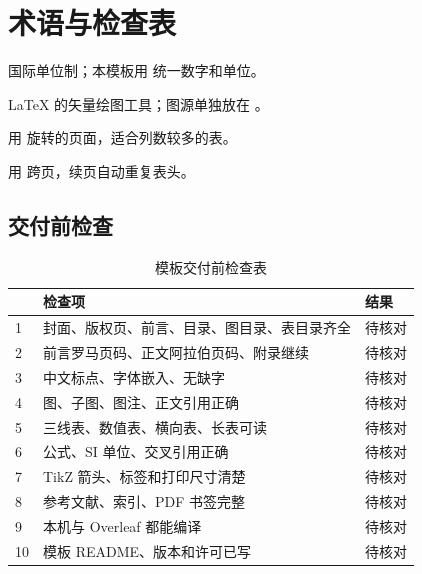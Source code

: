 \chapter{术语与检查表}\label{app:checklist}

\begin{description}[leftmargin=2.4em,style=nextline]
  \item[SI 单位] 国际单位制；本模板用  统一数字和单位。
  \item[TikZ] \LaTeX{} 的矢量绘图工具；图源单独放在 。
  \item[横向页] 用  旋转的页面，适合列数较多的表。
  \item[长表] 用  跨页，续页自动重复表头。
\end{description}

\section{交付前检查}

\begin{table}[htbp]
  \centering
  \caption{模板交付前检查表}\label{tab:delivery}
  \begin{tabularx}{\textwidth}{@{}p{}Xp{}@{}}
    \toprule
    & 检查项 & 结果 \\
    \midrule
    1 & 封面、版权页、前言、目录、图目录、表目录齐全 & 待核对 \\
    2 & 前言罗马页码、正文阿拉伯页码、附录继续 & 待核对 \\
    3 & 中文标点、字体嵌入、无缺字 & 待核对 \\
    4 & 图、子图、图注、正文引用正确 & 待核对 \\
    5 & 三线表、数值表、横向表、长表可读 & 待核对 \\
    6 & 公式、SI 单位、交叉引用正确 & 待核对 \\
    7 & TikZ 箭头、标签和打印尺寸清楚 & 待核对 \\
    8 & 参考文献、索引、PDF 书签完整 & 待核对 \\
    9 & 本机与 Overleaf 都能编译 & 待核对 \\
    10 & 模板 README、版本和许可已写 & 待核对 \\
    \bottomrule
  \end{tabularx}
\end{table}
